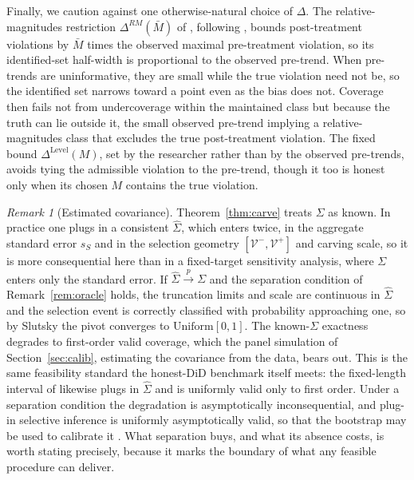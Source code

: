 \documentclass[12pt]{article}
\theoremstyle{remark}
\newtheorem{remark}{Remark}
\begin{document}
Finally, we caution against one otherwise-natural choice of $\Delta$. The relative-magnitudes restriction
$\Delta^{RM}(\bar M)$ of \citet{rambachan2023}, following \citet{manski2018}, bounds post-treatment
violations by $\bar M$ times the observed maximal pre-treatment violation, so its identified-set half-width
is proportional to the observed pre-trend. When pre-trends are uninformative, they are small while the true
violation need not be, so the identified set narrows toward a point even as the bias does not. Coverage then
fails not from undercoverage within the maintained class but because the truth can lie outside it, the small
observed pre-trend implying a relative-magnitudes class that excludes the true post-treatment violation. The
fixed bound $\Delta^{\mathrm{Level}}(M)$, set by the
researcher rather than by the observed pre-trends, avoids tying the admissible violation to the pre-trend,
though it too is honest only when its chosen $M$ contains the true violation.

\begin{remark}[Estimated covariance]\label{rem:sigmahat}
Theorem~\ref{thm:carve} treats $\Sigma$ as known. In practice one plugs in a consistent $\hat\Sigma$, which
enters twice, in the aggregate standard error $s_S$ and in the selection geometry
$[\mathcal V^-,\mathcal V^+]$ and carving scale, so it is more consequential here than in a fixed-target
sensitivity analysis, where $\Sigma$ enters only the standard error. If $\hat\Sigma\xrightarrow{p}\Sigma$ and
the separation condition of Remark~\ref{rem:oracle} holds, the truncation limits and scale are continuous in
$\hat\Sigma$ and the selection event is correctly classified with probability approaching one, so by Slutsky
the pivot converges to $\mathrm{Uniform}[0,1]$. The known-$\Sigma$ exactness degrades to first-order valid
coverage, which the panel simulation of Section~\ref{sec:calib}, estimating the covariance from the data,
bears out. This is the same feasibility standard the honest-DiD benchmark itself meets: the
fixed-length interval of \citet{rambachan2023} likewise plugs in $\hat\Sigma$ and is uniformly valid only
to first order. Under a separation condition the degradation is asymptotically inconsequential, and plug-in
selective inference is uniformly asymptotically valid, so that the bootstrap may be used to calibrate it
\citep{tibshirani2018}. What separation buys, and what its absence costs, is worth stating precisely,
because it marks the boundary of what any feasible procedure can deliver.
\end{remark}
\end{document}
